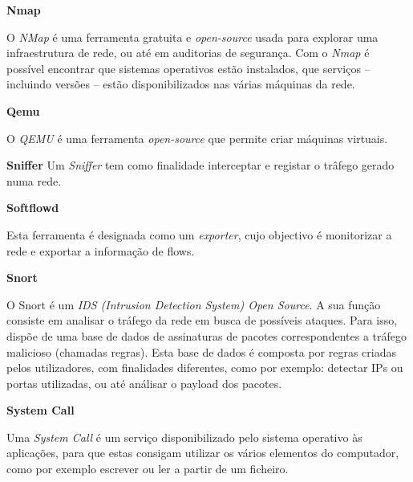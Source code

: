 \begin{description}
    \item \textbf{Nmap}

   O \textit{NMap} é uma ferramenta gratuita e \textit{open-source} usada para explorar uma infraestrutura de rede, ou até em auditorias de segurança. Com o \textit{Nmap} é possível encontrar que sistemas operativos estão instalados, que serviços -- incluindo versões --  estão disponibilizados nas várias máquinas da rede.
\end{description}

\begin{description}
    \item \textbf{Qemu}

    O \textit{QEMU} é uma ferramenta \textit{open-source} que permite criar máquinas virtuais.
\end{description}

\begin{description}
    \item \textbf{Sniffer}
    Um \textit{Sniffer} tem como finalidade interceptar e registar o trâfego gerado numa rede. 
\end{description}

\begin{description}
    \item \textbf{Softflowd}

    Esta ferramenta é designada como um \textit{exporter}, cujo objectivo é monitorizar a rede e exportar a informação de flows.
\end{description}

\begin{description}
    \item \textbf{Snort}

    O Snort é um \textit{IDS (Intrusion Detection System) Open Source}. A sua função consiste em analisar o tráfego da rede em busca de possíveis ataques. Para isso, dispõe de uma base de dados de assinaturas de pacotes correspondentes a tráfego malicioso (chamadas regras). Esta base de dados é composta por regras criadas pelos utilizadores, com finalidades diferentes, como por exemplo: detectar IPs ou portas utilizadas, ou até análisar o payload dos pacotes.
\end{description}

\begin{description}
    \item \textbf{System Call}

    Uma \textit{System Call} é um serviço disponibilizado pelo sistema operativo às aplicações, para que estas consigam utilizar os vários elementos do computador, como por exemplo escrever ou ler a partir de um ficheiro.
\end{description}

